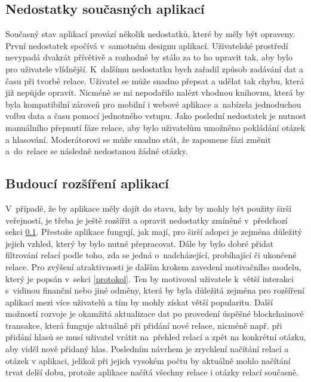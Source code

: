 \subsection{Nedostatky současných aplikací}
\label{nedostatky}
Současný stav aplikací provází několik nedostatků, které by měly být opraveny. První nedostatek spočívá v~samotném designu aplikací. Uživatelské prostředí nevypadá dvakrát přívětivě a rozhodně by stálo za to ho upravit tak, aby bylo pro uživatele vlídnější. K~dalšímu nedostatku bych zařadil způsob zadávání dat a času při tvorbě relace. Uživatel se může snadno přepsat a udělat tak chybu, která již nepůjde opravit. Nicméně se mi nepodařilo nalézt vhodnou knihovnu, která by byla kompatibilní zároveň pro mobilní i webové aplikace a~nabízela jednoduchou volbu data a času pomocí jednotného vstupu. Jako poslední nedostatek je nutnost manuálního přepnutí fáze relace, aby bylo uživatelům umožněno pokládání otázek a hlasování. Moderátorovi se může snadno stát, že zapomene fázi změnit a~do~relace se následně nedostanou žádné otázky.

\subsection{Budoucí rozšíření aplikací}
V~případě, že by aplikace měly dojít do stavu, kdy by mohly být použity širší veřejností, je třeba je ještě rozšířit a opravit nedostatky zmíněné v~předchozí sekci \ref{nedostatky}. Přestože aplikace fungují, jak mají, pro širší adopci je zejména důležitý jejich vzhled, který by bylo nutné přepracovat. Dále by bylo dobré přidat filtrování relací podle toho, zda se jedná o~nadcházející, probíhající či ukončené relace. Pro zvýšení atraktivnosti je dalším krokem zavedení motivačního modelu, který je popsán v~sekci \ref{protokol}. Ten by motivoval uživatele k~větší interakci s~vidinou finanční nebo jiné odměny, která by byla důležitá zejména pro rozšíření aplikací mezi více uživatelů a tím by mohly získat větší popularitu. Další možností rozvoje je okamžitá aktualizace dat po provedení úspěšné blockchainové transakce, která funguje aktuálně při přidání nové relace, nicméně např. při přidání hlasů se musí uživatel vrátit na~přehled relací a zpět na konkrétní otázku, aby viděl nově přidaný hlas. Posledním návrhem je zrychlení načítání relací a otázek v aplikaci, jelikož při jejich vysokém počtu by aktuálně mohlo načítání trvat delší dobu, protože aplikace načítá všechny relace i otázky relací současně.

